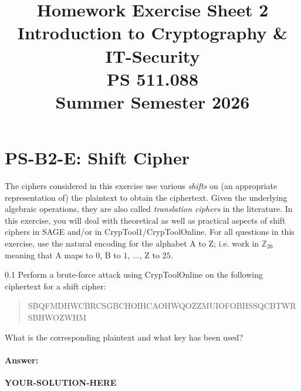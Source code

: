 \documentclass[]{scrartcl}
\title{Homework Exercise Sheet 2\\Introduction to Cryptography \& IT-Security\\PS 511.088\\Summer Semester 2026}
\author{\groupname}
\newcommand{\ZZ}{\mathbb{Z}}
\newcounter{exercise}
\newcounter{qid}[section]
\newcommand{\exerciseprefix}{prefix}
\newcommand{\questiontitle}{Questions}
\newcommand{\blockid}{B2}
\newcommand{\exname}{}
\newcommand{\ctone}{CrypTool1}
\newcommand{\ctonline}{CrypToolOnline}
\newcommand{\yoursolutionhere}{\textbf{YOUR-SOLUTION-HERE}}
\begin{document}
\maketitle
{}
\date{}
\newpage

\renewcommand{\exname}{Alg. Crypt.}
\section*{PS-\blockid{}-E\theexercise: Shift Cipher}
The ciphers considered in this exercise use various \emph{shifts} on (an appropriate representation of) the plaintext to obtain the ciphertext. Given the underlying algebraic operations, they are also called \emph{translation ciphers} in the literature. In this exercise, you will deal with theoretical as well as practical aspects of shift ciphers in SAGE and/or in \ctone{}/\ctonline{}. For all questions in this exercise, use the natural encoding for the alphabet A to Z; i.e. work in $\ZZ_{26}$ meaning that A maps to $0$, B to $1$, $\ldots$, Z to $25$. 

\newcommand{\cipherone}{SBQFMDHWCBRCSGBCHOIHCAOHWQOZZMUIOFOBHSSQCBTWRSBHWOZWHM}
\renewcommand{\exerciseprefix}{PS-\blockid{}-E\theexercise: \exname{}-Q\theqid}
\renewcommand{\questiontitle}{\exerciseprefix{}: Brute-force attack on shift cipher (I/II)}
\begin{exercisebox}{0.1}
Perform a brute-force attack using \ctonline{} on the following ciphertext for a shift cipher:
\begin{quote}
    {\tiny \cipherone{}}
\end{quote}
What is the corresponding plaintext and what key has been used?
\end{exercisebox}

\paragraph{Answer:} \yoursolutionhere{}
\end{document}
